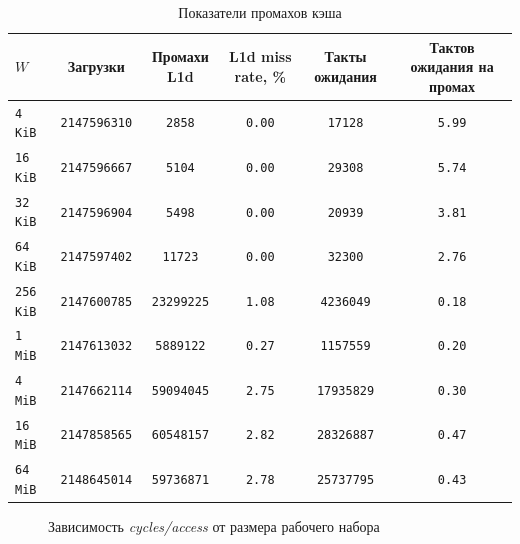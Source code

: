 \begin{table}[H]
\caption{Показатели промахов кэша}
\label{tab:working-set-cache}
\small
\begin{tabularx}{\textwidth}{|l|C|C|C|C|C|}
	\hline
	$W$ & Загрузки & Промахи L1d & L1d miss rate, \% & Такты ожидания & Тактов ожидания на промах \\
	\hline
	\texttt{4 KiB} & \texttt{2147596310} & \texttt{2858} & \texttt{0.00} & \texttt{17128} & \texttt{5.99} \\
	\hline
	\texttt{16 KiB} & \texttt{2147596667} & \texttt{5104} & \texttt{0.00} & \texttt{29308} & \texttt{5.74} \\
	\hline
	\texttt{32 KiB} & \texttt{2147596904} & \texttt{5498} & \texttt{0.00} & \texttt{20939} & \texttt{3.81} \\
	\hline
	\texttt{64 KiB} & \texttt{2147597402} & \texttt{11723} & \texttt{0.00} & \texttt{32300} & \texttt{2.76} \\
	\hline
	\texttt{256 KiB} & \texttt{2147600785} & \texttt{23299225} & \texttt{1.08} & \texttt{4236049} & \texttt{0.18} \\
	\hline
	\texttt{1 MiB} & \texttt{2147613032} & \texttt{5889122} & \texttt{0.27} & \texttt{1157559} & \texttt{0.20} \\
	\hline
	\texttt{4 MiB} & \texttt{2147662114} & \texttt{59094045} & \texttt{2.75} & \texttt{17935829} & \texttt{0.30} \\
	\hline
	\texttt{16 MiB} & \texttt{2147858565} & \texttt{60548157} & \texttt{2.82} & \texttt{28326887} & \texttt{0.47} \\
	\hline
	\texttt{64 MiB} & \texttt{2148645014} & \texttt{59736871} & \texttt{2.78} & \texttt{25737795} & \texttt{0.43} \\
	\hline
\end{tabularx}
\end{table}

\workingset
\begin{figure}[H]
	\centering
	\caption{Зависимость \textit{cycles/access} от размера рабочего набора}
	\label{fig:working-set-cycles}
\end{figure}

